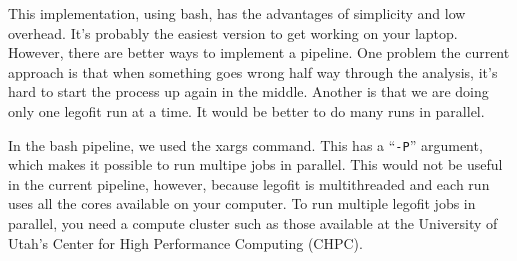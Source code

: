 \documentclass[11pt]{article}
\begin{document}
This implementation, using bash, has the advantages of simplicity and
low overhead. It's probably the easiest version to get working on your
laptop. However, there are better ways to implement a pipeline. One
problem the current approach is that when something goes wrong half
way through the analysis, it's hard to start the process up again in
the middle. Another is that we are doing only one legofit run at a
time. It would be better to do many runs in parallel.

In the bash pipeline, we used the xargs command. This has a
``\texttt{-P}'' argument, which makes it possible to run multipe jobs
in parallel. This would not be useful in the current pipeline,
however, because legofit is multithreaded and each run uses all the
cores available on your computer. To run multiple legofit jobs in
parallel, you need a compute cluster such as those available at the
University of Utah's Center for High Performance Computing (CHPC).
\end{document}
